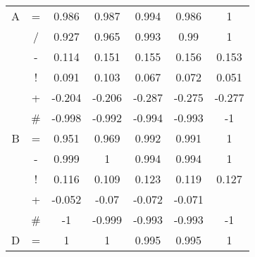 \documentclass{sfuthesis}
\begin{document}
\begin{table}
\begin{tabular}{ccccccc}
			A              & \multicolumn{1}{c|}{=}                & 0.986              & 0.987                 & 0.994                & \multicolumn{1}{c|}{0.986}               & 1             \\
			& \multicolumn{1}{c|}{/}                & 0.927              & 0.965                 & 0.993                & \multicolumn{1}{c|}{0.99}                & 1             \\
			& \multicolumn{1}{c|}{-}                & 0.114              & 0.151                 & 0.155                & \multicolumn{1}{c|}{0.156}               & 0.153         \\
			& \multicolumn{1}{c|}{!}                & 0.091              & 0.103                 & 0.067                & \multicolumn{1}{c|}{0.072}               & 0.051         \\
			& \multicolumn{1}{c|}{+}                & -0.204             & -0.206                & -0.287               & \multicolumn{1}{c|}{-0.275}              & -0.277        \\
			& \multicolumn{1}{c|}{\#}               & -0.998             & -0.992                & -0.994               & \multicolumn{1}{c|}{-0.993}              & -1            \\ \hline
			B              & \multicolumn{1}{c|}{=}                & 0.951              & 0.969                 & 0.992                & \multicolumn{1}{c|}{0.991}               & 1             \\
			& \multicolumn{1}{c|}{-}                & 0.999              & 1                     & 0.994                & \multicolumn{1}{c|}{0.994}               & 1             \\
			& \multicolumn{1}{c|}{!}                & 0.116              & 0.109                 & 0.123                & \multicolumn{1}{c|}{0.119}               & 0.127         \\
			& \multicolumn{1}{c|}{+}                & -0.052             & -0.07                 & -0.072               & \multicolumn{1}{c|}{-0.071}              &               \\
			& \multicolumn{1}{c|}{\#}               & -1                 & -0.999                & -0.993               & \multicolumn{1}{c|}{-0.993}              & -1            \\ \hline
			D              & \multicolumn{1}{c|}{=}                & 1                  & 1                     & 0.995                & \multicolumn{1}{c|}{0.995}               & 1             \\

\end{tabular}
\end{table}
\end{document}
